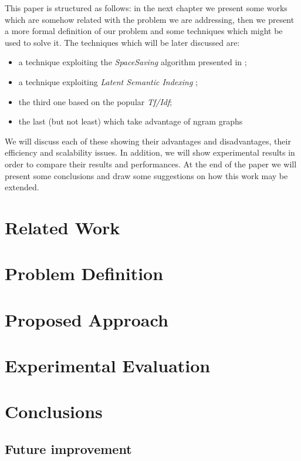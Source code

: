 \documentclass{acm_proc_article-sp-sigmod07}
\begin{document}
This paper is structured as follows: in the next chapter we present some works
which are somehow related with the problem we are addressing, then we present a more
formal definition of our problem and some techniques which might be
used to solve it. The techniques which will be later discussed are:
\begin{itemize}
	\item a technique exploiting the \emph{SpaceSaving} algorithm presented in
		\cite{SS};
	\item a technique exploiting \emph{Latent Semantic Indexing} \cite{LSA};
	\item the third one based on the popular \emph{Tf/Idf};
	\item the last (but not least) which take advantage of ngram graphs
		\cite{Ngram}
\end{itemize}
We will discuss each of these showing their advantages and
disadvantages, their efficiency and scalability issues. In addition, we will
show experimental results in order to compare their results and performances.
At the end of the paper we will present
some conclusions and draw some suggestions on how this work may be extended.

\section*{Related Work}


\section*{Problem Definition}


\section*{Proposed Approach}


\section*{Experimental Evaluation}


\section*{Conclusions}
\subsection*{Future improvement}
\end{document}
